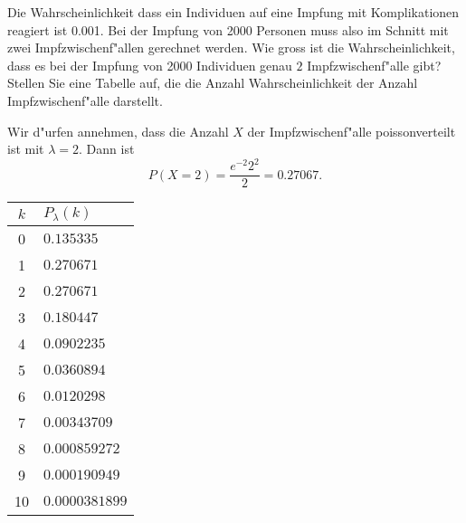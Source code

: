 Die Wahrscheinlichkeit dass ein Individuen auf eine Impfung
mit Komplikationen reagiert ist 0.001.
Bei der Impfung von 2000 Personen muss also im Schnitt
mit zwei Impfzwischenf"allen gerechnet werden.
Wie gross ist die Wahrscheinlichkeit, dass es
bei der Impfung von 2000 Individuen genau $2$ Impfzwischenf"alle
gibt? Stellen Sie eine Tabelle auf, die die Anzahl Wahrscheinlichkeit
der Anzahl Impfzwischenf"alle darstellt.

\begin{loesung}
Wir d"urfen annehmen, dass die Anzahl $X$ der Impfzwischenf"alle
poissonverteilt ist mit $\lambda=2$. Dann ist
$$P(X=2)=\frac{e^{-2}2^2}2=0.27067.
$$
\begin{center}
\begin{tabular}{|c|l|}
\hline
$k$&$P_\lambda(k)$\\
\hline
0&$0.135335$\\
1&$0.270671$\\
2&$0.270671$\\
3&$0.180447$\\
4&$0.0902235$\\
5&$0.0360894$\\
6&$0.0120298$\\
7&$0.00343709$\\
8&$0.000859272$\\
9&$0.000190949$\\
10&$0.0000381899$\\
\hline
\end{tabular}
\end{center}
\end{loesung}
